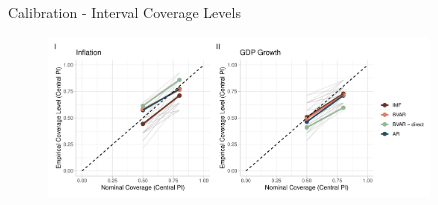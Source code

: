 \documentclass[en]{sdqbeamer}
\begin{document}
\begin{frame}{Calibration - Interval Coverage Levels}
    \begin{figure}
        \centering
        \includegraphics[width=0.9\textwidth]{figures/coverage.pdf}
        \label{fig:enter-label}
    \end{figure}
\end{frame}
\end{document}
